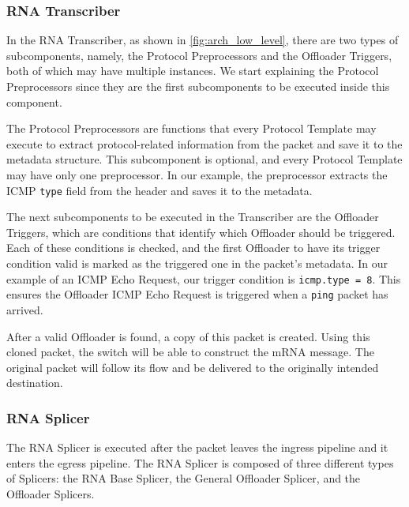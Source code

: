 \subsubsection*{RNA Transcriber}

In the RNA Transcriber, as shown in \autoref{fig:arch_low_level}, there are two types of subcomponents, namely, the Protocol Preprocessors and the Offloader Triggers, both of which may have multiple instances. We start explaining the Protocol Preprocessors since they are the first subcomponents to be executed inside this component.

The Protocol Preprocessors are functions that every Protocol Template may execute to extract protocol-related information from the packet and save it to the metadata structure. This subcomponent is optional, and every Protocol Template may have only one preprocessor. In our example, the preprocessor extracts the ICMP \texttt{type} field from the header and saves it to the metadata.

The next subcomponents to be executed in the Transcriber are the Offloader Triggers, which are conditions that identify which Offloader should be triggered. Each of these conditions is checked, and the first Offloader to have its trigger condition valid is marked as the triggered one in the packet's metadata. In our example of an ICMP Echo Request, our trigger condition is \texttt{icmp.type = 8}. This ensures the Offloader ICMP Echo Request is triggered when a \texttt{ping} packet has arrived.


After a valid Offloader is found, a copy of this packet is created. Using this cloned packet, the switch will be able to construct the mRNA message. The original packet will follow its flow and be delivered to the originally intended destination.

\subsubsection*{RNA Splicer}

The RNA Splicer is executed after the packet leaves the ingress pipeline and it enters the egress pipeline\footnotemark{}. The RNA Splicer is composed of three different types of Splicers: the RNA Base Splicer, the General Offloader Splicer, and the Offloader Splicers.


